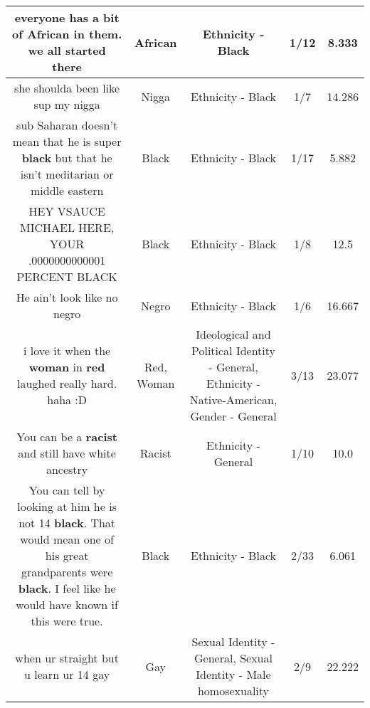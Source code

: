 \documentclass[11pt]{article}
\newlength\mylength
\begin{document}
\begin{center}
\begin{longtable}{|C{.65\mylength}|C{.30\mylength}|C{.12\mylength}|C{.12\mylength}|C{.12\mylength}|}
  \small everyone has a bit of \textbf{African} in them. we all started there\normalsize   & African & Ethnicity - Black & 1/12 & 8.333 \\  \hline
  \small she shoulda been like sup my nigga\normalsize   & Nigga & Ethnicity - Black & 1/7 & 14.286 \\  \hline
  \small sub Saharan doesn't mean that he is super \textbf{black} but that he isn't meditarian or middle eastern\normalsize   & Black & Ethnicity - Black & 1/17 & 5.882 \\  \hline
  \small HEY VSAUCE MICHAEL HERE, YOUR .0000000000001 PERCENT BLACK\normalsize   & Black & Ethnicity - Black & 1/8 & 12.5 \\  \hline
  \small He ain't look like no negro\normalsize   & Negro & Ethnicity - Black & 1/6 & 16.667 \\  \hline
  \small i love it when the \textbf{woman} in \textbf{r\textbf{ed}} laughed really hard. haha :D\normalsize   & Red, Woman &  Ideological and Political Identity - General, Ethnicity - Native-American, Gender - General & 3/13 & 23.077 \\  \hline
  \small You can be a \textbf{racist} and still have white ancestry\normalsize   & Racist & Ethnicity - General & 1/10 & 10.0 \\  \hline
  \small You can tell by looking at him he is not 14 \textbf{black}. That would mean one of his great grandparents were \textbf{black}. I feel like he would have known if this were true.\normalsize   & Black & Ethnicity - Black & 2/33 & 6.061 \\  \hline
  \small when ur straight but u learn ur 14 gay\normalsize   & Gay & Sexual Identity - General, Sexual Identity - Male homosexuality & 2/9 & 22.222 \\  \hline

\end{longtable}
\end{center}
\end{document}
